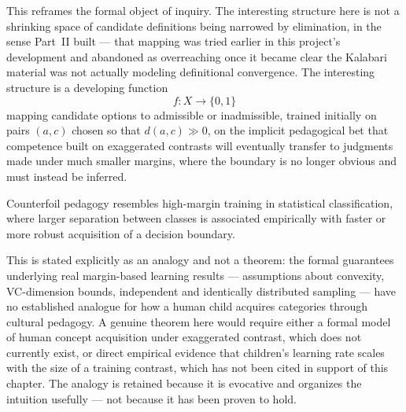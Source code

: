 This reframes the formal object of inquiry. The interesting structure here is not a shrinking space of candidate definitions being narrowed by elimination, in the sense Part~II built --- that mapping was tried earlier in this project's development and abandoned as overreaching once it became clear the Kalabari material was not actually modeling definitional convergence. The interesting structure is a developing function
\[
f : X \to \{0,1\}
\]
mapping candidate options to admissible or inadmissible, trained initially on pairs $(a,c)$ chosen so that $d(a,c) \gg 0$, on the implicit pedagogical bet that competence built on exaggerated contrasts will eventually transfer to judgments made under much smaller margins, where the boundary is no longer obvious and must instead be inferred.

\begin{analogy}
Counterfoil pedagogy resembles high-margin training in statistical classification, where larger separation between classes is associated empirically with faster or more robust acquisition of a decision boundary.
\end{analogy}

This is stated explicitly as an analogy and not a theorem: the formal guarantees underlying real margin-based learning results --- assumptions about convexity, VC-dimension bounds, independent and identically distributed sampling --- have no established analogue for how a human child acquires categories through cultural pedagogy. A genuine theorem here would require either a formal model of human concept acquisition under exaggerated contrast, which does not currently exist, or direct empirical evidence that children's learning rate scales with the size of a training contrast, which has not been cited in support of this chapter. The analogy is retained because it is evocative and organizes the intuition usefully --- not because it has been proven to hold.
